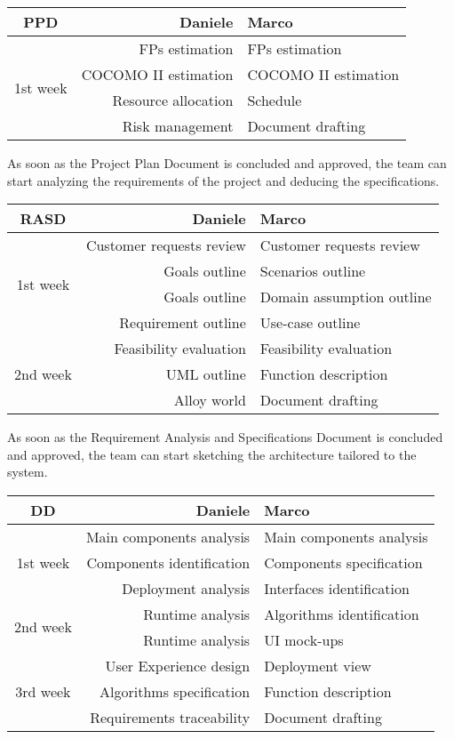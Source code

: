 \documentclass{scrreprt}
\begin{document}
\begin{center}
\begin{tabular}{c|rl}
\toprule PPD& \textbf{Daniele} & \textbf{Marco} \\ \midrule
\multirow{ 4}{*}{1st week}&FPs estimation&FPs estimation\\ 	 
&COCOMO II estimation&COCOMO II estimation\\
&Resource allocation&Schedule\\
&Risk management & Document drafting \\
\bottomrule
\end{tabular}
\end{center}

As soon as the Project Plan Document is concluded and approved, the team can start analyzing the requirements of the project and deducing the specifications.

\begin{center}
\begin{tabular}{c|rl}
\toprule RASD& \textbf{Daniele} & \textbf{Marco} \\ \midrule
\multirow{ 4}{*}{1st week}&Customer requests review&Customer requests review\\ 
&Goals outline&Scenarios outline\\
&Goals outline&Domain assumption outline\\	 
&Requirement outline&Use-case outline\\
\midrule
\multirow{ 3}{*}{2nd week}&Feasibility evaluation&Feasibility evaluation\\
&UML outline& Function description \\
&Alloy world & Document drafting \\
\bottomrule
\end{tabular}
\end{center}

As soon as the Requirement Analysis and Specifications Document is concluded and approved, the team can start sketching the architecture tailored to the system.

\begin{center}
\begin{tabular}{c|rl}
\toprule DD & \textbf{Daniele} & \textbf{Marco} \\ \midrule
\multirow{ 3}{*}{1st week}&Main components analysis&Main components analysis\\ 
&Components identification&Components specification\\
&Deployment analysis&Interfaces identification\\	 
\midrule
\multirow{ 2}{*}{2nd week} &Runtime analysis& Algorithms identification\\
&Runtime analysis & UI mock-ups \\
\midrule
\multirow{ 3}{*}{3rd week}&User Experience design&Deployment view\\
&Algorithms specification& Function description \\
&Requirements traceability & Document drafting \\
\bottomrule
\end{tabular}
\end{center}
\end{document}
